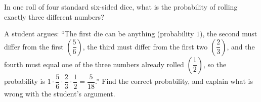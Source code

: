 In one roll of four standard six-sided dice, what is the probability of rolling exactly three different numbers?

A student argues: ``The first die can be anything (probability $1$), the second must differ from the first $\left(\dfrac56\right)$, the third must differ from the first two $\left(\dfrac23\right)$, and the fourth must equal one of the three numbers already rolled $\left(\dfrac12\right)$, so the probability is $1\cdot\dfrac56\cdot\dfrac23\cdot\dfrac12=\dfrac{5}{18}$.'' Find the correct probability, and explain what is wrong with the student's argument.
